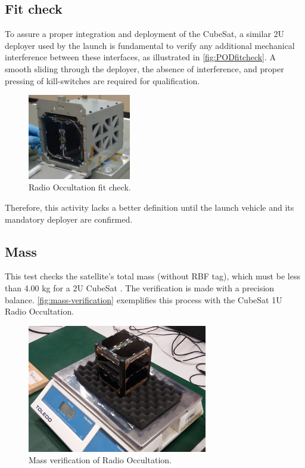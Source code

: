 \subsection{Fit check}

To assure a proper integration and deployment of the CubeSat, a similar 2U deployer used by the launch is fundamental to verify any additional mechanical interference between these interfaces, as illustrated in \autoref{fig:PODfitcheck}. A smooth sliding through the deployer, the absence of interference, and proper pressing of kill-switches are required for qualification.



\begin{figure}[!htb]
    \begin{center}
        \includegraphics[width=0.4\textwidth]{figures/fit-test.png}
        \caption{Radio Occultation fit check.}
        \label{fig:PODfitcheck}
    \end{center}
\end{figure}


Therefore, this activity lacks a better definition until the launch vehicle and its mandatory deployer are confirmed.

\subsection{Mass}

This test checks the satellite's total mass (without RBF tag), which must be less than 4.00 kg for a 2U CubeSat \cite{cds}. The verification is made with a precision balance. \autoref{fig:mass-verification} exemplifies this process with the CubeSat 1U Radio Occultation.

\begin{figure}[H]
    \begin{center}
        \includegraphics[width=0.7\textwidth]{figures/mass-test.png}
        \caption{Mass verification of Radio Occultation.}
        \label{fig:mass-verification}
    \end{center}
\end{figure}

